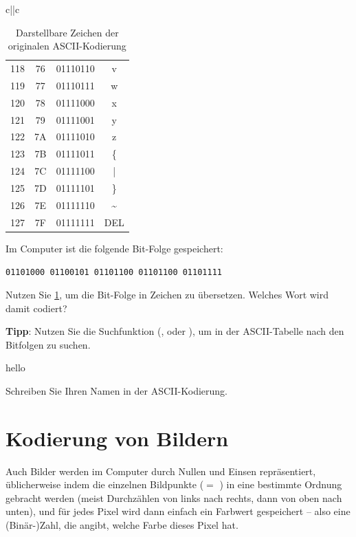 \begin{table}[H]
{\begin{tabular}{c||c}
\begin{tabular}{cccc}
				118     & 76          & 01110110 & v               \\
				119     & 77          & 01110111 & w               \\
				120     & 78          & 01111000 & x               \\
				121     & 79          & 01111001 & y               \\
				122     & 7A          & 01111010 & z               \\
				123     & 7B          & 01111011 & \{              \\
				124     & 7C          & 01111100 & |               \\
				125     & 7D          & 01111101 & \}              \\
				126     & 7E          & 01111110 & \textasciitilde \\
				127     & 7F          & 01111111 & DEL             \\
				\bottomrule
			\end{tabular}
		\end{tabular}}
	\caption{Darstellbare Zeichen der originalen \gls{ASCII}-Kodierung}
	\label{table:ascii}
\end{table}
\clearpage

\begin{myexercise}
	Im Computer ist die folgende Bit-Folge gespeichert:

	\texttt{01101000 01100101 01101100 01101100 01101111}

	Nutzen Sie \cref{table:ascii}, um die Bit-Folge in Zeichen zu übersetzen. Welches Wort wird damit codiert?

	\textbf{Tipp}: Nutzen Sie die Suchfunktion (, oder ), um in der ASCII-Tabelle nach den Bitfolgen zu suchen.
	\begin{myanswer}
		hello
	\end{myanswer}
\end{myexercise}

\begin{myexercise}
	Schreiben Sie Ihren Namen in der \gls{ASCII}-Kodierung.
\end{myexercise}

\section{Kodierung von Bildern}

Auch Bilder werden im Computer durch Nullen und Einsen repräsentiert, üblicherweise indem die einzelnen Bildpunkte ($=$ ) in eine bestimmte Ordnung gebracht werden (meist Durchzählen von links nach rechts, dann von oben nach unten), und für jedes Pixel wird dann einfach ein Farbwert gespeichert -- also eine (Binär-)Zahl, die angibt, welche Farbe dieses Pixel hat.

